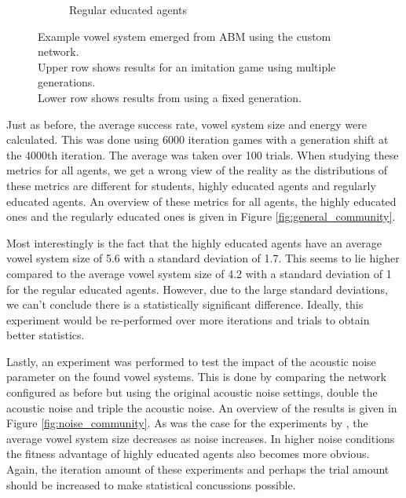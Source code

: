 \begin{figure}[ht]
\begin{subfigure}{.30\textwidth}
        \captionsetup{width=0.9\linewidth}
        \captionsetup{justification=centering}
        \caption{Regular educated agents}
    \end{subfigure}
    \captionsetup{width=0.9\linewidth}
    \captionsetup{justification=centering}
    \caption{Example vowel system emerged from ABM using the custom network.\\Upper row shows results for an imitation game using multiple generations.\\Lower row shows results from using a fixed generation.}
    \label{fig:samples_community}
\end{figure}


\clearpage
Just as before, the average success rate, vowel system size and energy were calculated.
This was done using 6000 iteration games with a generation shift at the 4000th iteration.
The average was taken over 100 trials.
When studying these metrics for all agents, we get a wrong view of the reality as the distributions of these metrics are different for students, highly educated agents and regularly educated agents.
An overview of these metrics for all agents, the highly educated ones and the regularly educated ones is given in Figure \ref{fig:general_community}.

Most interestingly is the fact that the highly educated agents have an average vowel system size of 5.6 with a standard deviation of 1.7.
This seems to lie higher compared to the average vowel system size of 4.2 with a standard deviation of 1 for the regular educated agents.
However, due to the large standard deviations, we can't conclude there is a statistically significant difference.
Ideally, this experiment would be re-performed over more iterations and trials to obtain better statistics.

Lastly, an experiment was performed to test the impact of the acoustic noise parameter on the found vowel systems.
This is done by comparing the network configured as before but using the original acoustic noise settings, double the acoustic noise and triple the acoustic noise.
An overview of the results is given in Figure \ref{fig:noise_community}.
As was the case for the experiments by \citet{deBoer2000}, the average vowel system size decreases as noise increases.
In higher noise conditions the fitness advantage of highly educated agents also becomes more obvious.
Again, the iteration amount of these experiments and perhaps the trial amount should be increased to make statistical concussions possible.



